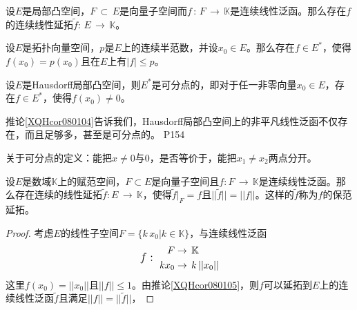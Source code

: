 \begin{corollary}
	设$E$是局部凸空间，$F\,\subset \, E $是向量子空间而$f\,: \,F\, \rightarrow \, \mathbb{K} $是连续线性泛函。那么存在$f$的连续线性延拓$\tilde{f}:\,E\,\rightarrow \, \mathbb{K} $。
\end{corollary}

\begin{corollary}
	设$E$是拓扑向量空间，$p$是$E$上的连续半范数，并设$x_{0}\in E$。那么存在$f\in E^{*} $，使得$f(x_{0})=p(x_{0}) $且在$E$上有$|f|\leq p $。
\end{corollary}

\begin{corollary}\label{XQHcor080104}
	设$E$是Hausdorff局部凸空间，则$E^{*}$是可分点的，即对于任一非零向量$x_{0} \in E$，存在$f\in E^{*} $，使得$f(x_{0})\neq 0 $。
\end{corollary}

\original
{
	推论\ref{XQHcor080104}告诉我们，Hausdorff局部凸空间上的非平凡线性泛函不仅存在，而且足够多，甚至是可分点的。
}
{P154}

\begin{proposition}
	关于可分点的定义：能把$x\neq 0$与$0$，是否等价于，能把$x_{1}\neq x_{2} $两点分开。
\end{proposition}

\begin{corollary}\label{XQHcor080105}
	设$E$是数域$\mathbb{K}$上的赋范空间，$F\subset E $是向量子空间且$f:F\, \rightarrow \, \mathbb{K} $是连续线性泛函。那么存在连续的线性延拓$\tilde{f} : E\, \rightarrow \, \mathbb{K} $，使得$\tilde{f}\big|_{F}=f  $且$||\tilde{f}||=||f|| $。这样的$\tilde{f} $称为$f $的保范延拓。
\end{corollary}


\begin{proof}
	考虑$E$的线性子空间$F=\{k\, x_{0}\big| k\in \mathbb{K} \} $，与连续线性泛函
	\begin{equation*}
		{\large\text{$f:$}}\,\,\,\,
		\begin{aligned}
			F& \rightarrow \, \mathbb{K}\\
			kx_{0}& \rightarrow \, k\, ||x_{0}||
		\end{aligned}
	\end{equation*}
	这里$f(x_{0})=||x_{0}||$且$||f||\leq 1$。由推论\ref{XQHcor080105}，则$f$可以延拓到$E$上的连续线性泛函$\tilde{f} $且满足$||f||=||\tilde{f}|| $，

\end{proof}

